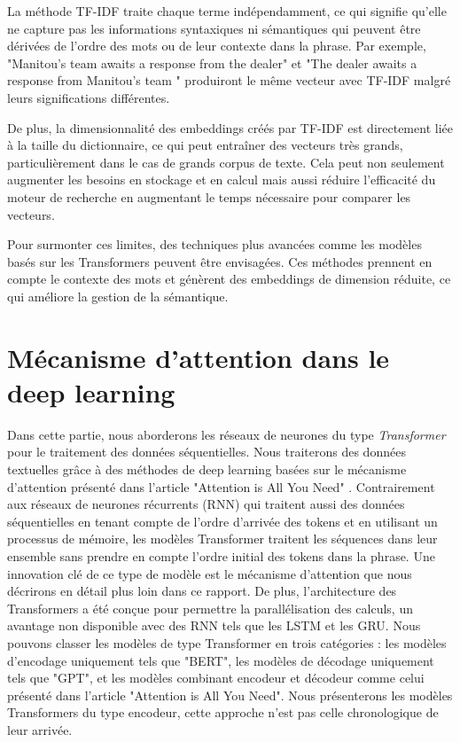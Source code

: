 \documentclass[12pt]{article}
\theoremstyle{definition}
\begin{document}
La méthode TF-IDF traite chaque terme indépendamment, ce qui signifie qu'elle ne capture pas les informations syntaxiques ni sémantiques qui peuvent être dérivées de l'ordre des mots ou de leur contexte dans la phrase. Par exemple, "Manitou's team awaits a response from the dealer" et "The dealer awaits a response from Manitou's team " produiront le même vecteur avec TF-IDF malgré leurs significations différentes. 

De plus, la dimensionnalité des embeddings créés par TF-IDF est directement liée à la taille du dictionnaire, ce qui peut entraîner des vecteurs très grands, particulièrement dans le cas de grands corpus de texte. Cela peut non seulement augmenter les besoins en stockage et en calcul mais aussi réduire l'efficacité du moteur de recherche en augmentant le temps nécessaire pour comparer les vecteurs.

Pour surmonter ces limites, des techniques plus avancées comme les modèles basés sur les Transformers peuvent être envisagées. Ces méthodes prennent en compte le contexte des mots et génèrent des embeddings de dimension réduite, ce qui améliore la gestion de la sémantique.

\section{Mécanisme d'attention dans le deep learning}

Dans cette partie, nous aborderons les réseaux de neurones du type \emph{Transformer} pour le traitement des données séquentielles. Nous traiterons des données textuelles grâce à des méthodes de deep learning basées sur le mécanisme d'attention présenté dans l'article "Attention is All You Need" \cite{a_i_a_y_n}. Contrairement aux réseaux de neurones récurrents (RNN) qui traitent aussi des données séquentielles en tenant compte de l'ordre d'arrivée des tokens et en utilisant un processus de mémoire, les modèles Transformer traitent les séquences dans leur ensemble sans prendre en compte l'ordre initial des tokens dans la phrase. Une innovation clé de ce type de modèle est le mécanisme d'attention que nous décrirons en détail plus loin dans ce rapport. De plus, l'architecture des Transformers a été conçue pour permettre la parallélisation des calculs, un avantage non disponible avec des RNN tels que les LSTM et les GRU. Nous pouvons classer les modèles de type Transformer en trois catégories : les modèles d'encodage uniquement tels que "BERT", les modèles de décodage uniquement tels que "GPT", et les modèles combinant encodeur et décodeur comme celui présenté dans l'article "Attention is All You Need". Nous présenterons les modèles Transformers du type encodeur, cette approche n'est pas celle chronologique de leur arrivée.
\end{document}

